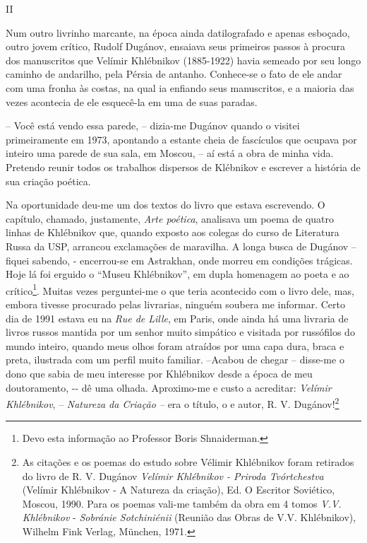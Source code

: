 II

Num outro livrinho marcante, na época ainda datilografado e apenas
esboçado, outro jovem crítico, Rudolf Dugánov, ensaiava seus primeiros
passos à procura dos manuscritos que Velímir Khlébnikov (1885-1922)
havia semeado por seu longo caminho de andarilho, pela Pérsia de
antanho. Conhece-se o fato de ele andar com uma fronha às costas, na
qual ia enfiando seus manuscritos, e a maioria das vezes acontecia de
ele esquecê-la em uma de suas paradas.

-- Você está vendo essa parede, -- dizia-me Dugánov quando o visitei
primeiramente em 1973, apontando a estante cheia de fascículos que
ocupava por inteiro uma parede de sua sala, em Moscou, -- aí está a obra
de minha vida. Pretendo reunir todos os trabalhos dispersos de Klébnikov
e escrever a história de sua criação poética.

Na oportunidade deu-me um dos textos do livro que estava escrevendo. O
capítulo, chamado, justamente, \emph{Arte poética}, analisava um poema
de quatro linhas de Khlébnikov que, quando exposto aos colegas do curso
de Literatura Russa da USP, arrancou exclamações de maravilha. A longa
busca de Dugánov -- fiquei sabendo, - encerrou-se em Astrakhan, onde
morreu em condições trágicas. Hoje lá foi erguido o ``Museu
Khlébnikov'', em dupla homenagem ao poeta e ao crítico\footnote{Devo
  esta informação ao Professor Boris Shnaiderman.}. Muitas vezes
perguntei-me o que teria acontecido com o livro dele, mas, embora
tivesse procurado pelas livrarias, ninguém soubera me informar. Certo
dia de 1991 estava eu na \emph{Rue de Lille}, em Paris, onde ainda há
uma livraria de livros russos mantida por um senhor muito simpático e
visitada por russófilos do mundo inteiro, quando meus olhos foram
atraídos por uma capa dura, braca e preta, ilustrada com um perfil muito
familiar. --Acabou de chegar -- disse-me o dono que sabia de meu
interesse por Khlébnikov desde a época de meu doutoramento, -\/- dê uma
olhada. Aproximo-me e custo a acreditar: \emph{Velímir Khlébnikov}, --
\emph{Natureza da Criação --} era o título, o e autor, R. V.
Dugánov!\footnote{As citações e os poemas do estudo sobre Vélimir
  Khlébnikov foram retirados do livro de R. V. Dugánov \emph{Velímir
  Khlébnikov - Priroda Tvórtchestva} (Velímir Khlébnikov - A Natureza da
  criação), Ed. O Escritor Soviético, Moscou, 1990. Para os poemas
  vali-me também da obra em 4 tomos \emph{V.V. Khlébnikov} -
  \emph{Sobránie Sotchiniénii} (Reunião das Obras de V.V. Khlébnikov),
  Wilhelm Fink Verlag, München, 1971.}

